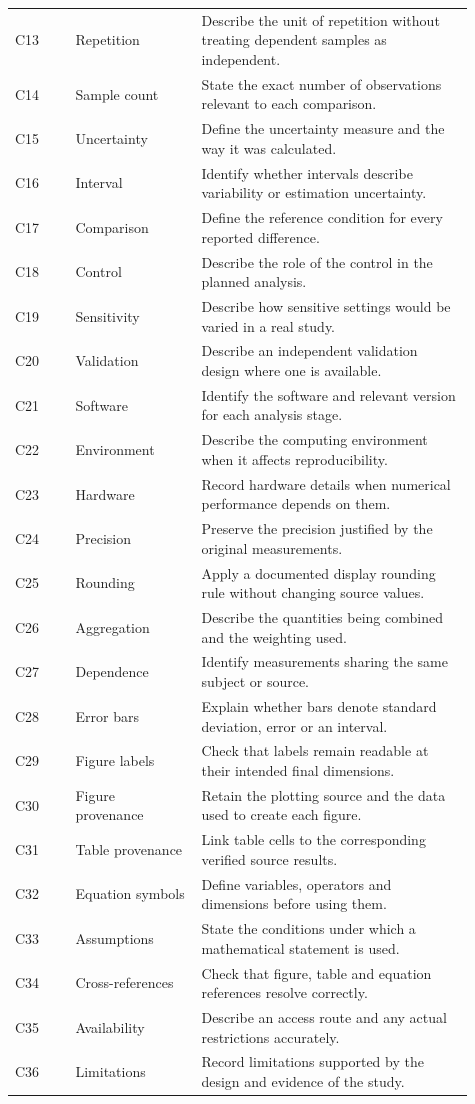 \documentclass[11pt,a4paper]{article}
\begin{document}
\begin{longtable}{@{}p{0.12\linewidth}p{0.25\linewidth}p{0.54\linewidth}@{}}
C13 & Repetition & Describe the unit of repetition without treating dependent samples as independent.\\
C14 & Sample count & State the exact number of observations relevant to each comparison.\\
C15 & Uncertainty & Define the uncertainty measure and the way it was calculated.\\
C16 & Interval & Identify whether intervals describe variability or estimation uncertainty.\\
C17 & Comparison & Define the reference condition for every reported difference.\\
C18 & Control & Describe the role of the control in the planned analysis.\\
C19 & Sensitivity & Describe how sensitive settings would be varied in a real study.\\
C20 & Validation & Describe an independent validation design where one is available.\\
C21 & Software & Identify the software and relevant version for each analysis stage.\\
C22 & Environment & Describe the computing environment when it affects reproducibility.\\
C23 & Hardware & Record hardware details when numerical performance depends on them.\\
C24 & Precision & Preserve the precision justified by the original measurements.\\
C25 & Rounding & Apply a documented display rounding rule without changing source values.\\
C26 & Aggregation & Describe the quantities being combined and the weighting used.\\
C27 & Dependence & Identify measurements sharing the same subject or source.\\
C28 & Error bars & Explain whether bars denote standard deviation, error or an interval.\\
C29 & Figure labels & Check that labels remain readable at their intended final dimensions.\\
C30 & Figure provenance & Retain the plotting source and the data used to create each figure.\\
C31 & Table provenance & Link table cells to the corresponding verified source results.\\
C32 & Equation symbols & Define variables, operators and dimensions before using them.\\
C33 & Assumptions & State the conditions under which a mathematical statement is used.\\
C34 & Cross-references & Check that figure, table and equation references resolve correctly.\\
C35 & Availability & Describe an access route and any actual restrictions accurately.\\
C36 & Limitations & Record limitations supported by the design and evidence of the study.\\
\end{longtable}
\normalsize
\end{document}
